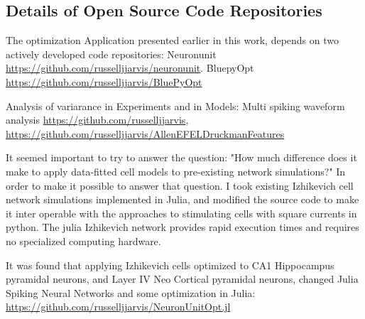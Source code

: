 
\subsection{Details of Open Source Code Repositories}
The optimization Application presented earlier in this work, depends on two actively developed code repositories:
Neuronunit \url{https://github.com/russelljjarvis/neuronunit}.
BluepyOpt \url{https://github.com/russelljjarvis/BluePyOpt}

Analysis of variarance in Experiments and in Models:
Multi spiking waveform analysis \url{https://github.com/russelljjarvis}, \url{https://github.com/russelljjarvis/AllenEFELDruckmanFeatures}

It seemed important to try to answer the question: "How much difference does it make to apply data-fitted cell models to pre-existing network simulations?" In order to make it possible to answer that question. I took existing Izhikevich cell network simulations implemented in Julia, and modified the source code to make it inter operable with the approaches to stimulating cells with square currents in python. The julia Izhikevich network provides rapid execution times and requires no specialized computing hardware.

It was found that applying Izhikevich cells optimized to CA1 Hippocampus pyramidal neurons, and Layer IV Neo Cortical pyramidal neurons, changed 
Julia Spiking Neural Networks and some optimization in Julia:
\url{https://github.com/russelljjarvis/NeuronUnitOpt.jl}
